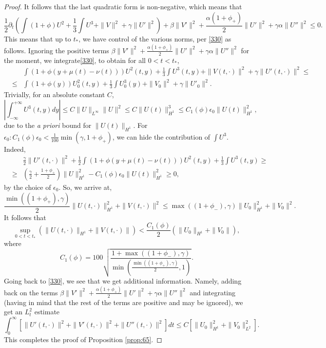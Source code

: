 \documentclass[10pt,a4paper]{amsart}
\newcommand{\al}{\alpha}
\newcommand{\be}{\beta}
\newcommand{\eps}{\epsilon}
\newcommand{\f}[2]{\frac{#1}{#2}}
\newcommand{\ga}{\gamma}
\newcommand{\p}{\partial}
\begin{document}
\begin{proof}
It follows that the last quadratic form is non-negative, which means that 
\begin{equation}
	\label{330} 
	\f{1}{2} \p_t\left( \int (1+ \phi) U^2+\f{1}{3} \int U^3+\|V\|^2+ \ga \|U'\|^2 \right) +  \be\|V'\|^2 +\f{\al(1+\phi_+)}{2} \|U'\|^2+  \ga \al \|U''\|^2\leq 0.
\end{equation}
This means that up to  $t_*$, we have control of the various norms, per \eqref{330} as follows. Ignoring the positive terms $ \be\|V'\|^2 +\f{\al(1+\phi_+)}{2} \|U'\|^2+  \ga \al \|U''\|^2$ for the moment, we  integrate\eqref{330}, to obtain for all $0<t<t_*$, 
\begin{eqnarray*}
& & 	 \int  (1+\phi(y+\mu(t)-\nu(t)) ) U^2(t, y)+\f{1}{3} \int U^3(t,y)+\|V(t,\cdot)\|^2+ \ga \|U'(t,\cdot)\|^2 \leq \\
	 &\leq &  \int  (1+\phi(y))  U_0^2(t, y)+\f{1}{3} \int U_0^3(y)+\|V_0\|^2+ \ga \|U'_0\|^2. 
\end{eqnarray*}
Trivially, for an absolute constant $C$, 
$$
|\int_{-\infty}^{+\infty}  U^3(t,y) dy|\leq C \|U\|_{L^\infty} \|U\|^2\leq C \|U(t)\|_{H^1}^3\leq C_1(\phi) \eps_0 \|U(t)\|_{H^1}^2, 
$$
due to the {\it a priori} bound for $\|U(t)\|_{H^1}$. 
For $\eps_0: C_1(\phi)\eps_0<\f{1}{100} \min(\ga, 1+\phi_+)$, we can hide the contribution of $\int U^3$. Indeed, 
\begin{eqnarray*}
	& & \f{\ga}{2} \|U'(t,\cdot)\|^2+  \f{1}{2} \int  (1+\phi(y+\mu(t)-\nu(t)) ) U^2(t, y) + \f{1}{3} \int U^3(t,y)\geq \\
	&\geq & \left(\f{\ga}{2}+\f{1+\phi_+}{2}\right) \|U\|_{H^1}^2 - C_1(\phi) \eps_0 \|U(t)\|_{H^1}^2\geq 0, 
\end{eqnarray*}
by the choice of $\eps_0$. So, we arrive at, 
\begin{equation}
	\label{414} 
	\f{\min((1+\phi_+), \ga)}{2} \|U(t, \cdot)\|_{H^1}^2 + \|V(t,\cdot)\|^2 \leq 	\max((1+\phi_-),\ga)  \|U_0\|_{H^1}^2+\|V_0\|^2. 
\end{equation}
It follows that 
\begin{equation}
	\label{418} 
	\sup_{0<t<t_*} (\|U(t, \cdot)\|_{H^1}+\|V(t,\cdot)\|)< \f{C_1(\phi)}{2}( \|U_0\|_{H^1}+\|V_0\|),
\end{equation}
where 
\begin{equation}
	\label{419} 
C_1(\phi)=100\sqrt{ \f{1+\max((1+\phi_-),\ga)}{\min(\f{\min((1+\phi_+), \ga)}{2},1)}}. 
\end{equation}
  Going back to \eqref{330}, we see that we get additional information. Namely, adding back on the terms $\be\|V'\|^2 +\f{\al(1+\phi_+)}{2} \|U'\|^2+  \ga \al \|U''\|^2$ and integrating (having in mind that the rest of the terms are positive and may be ignored), we get an $L^2_t$ estimate 
\begin{equation}
	\label{360} 
	\int_0^{\infty} [\|U'(t, \cdot)\|^2+\|V'(t, \cdot)\|^2 + \|U''(t,\cdot)\|^2] dt\leq C  [\|U_0\|_{H^1}^2 +
	\|V_0\|_{L^2}^2].
\end{equation}
This completes the proof of Proposition \ref{prop:65}. 
\end{proof}
\end{document}

